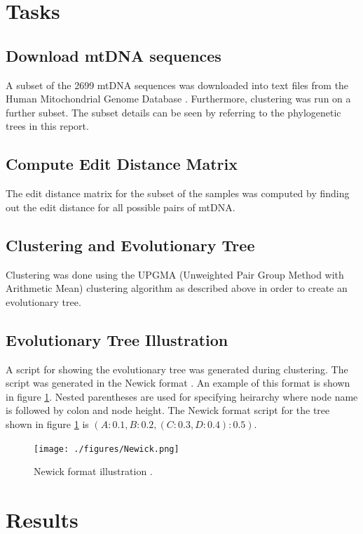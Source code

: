 \documentclass[conference]{IEEEtran}
\begin{document}
\section{Tasks}

\subsection{Download mtDNA sequences}
A subset of the 2699 mtDNA sequences was downloaded into text files from the Human Mitochondrial Genome Database \cite{mtDnaDatabase}. Furthermore, clustering was run on a further subset. The subset details can be seen by referring to the phylogenetic trees in this report.

\subsection{Compute Edit Distance Matrix}

The edit distance matrix for the subset of the samples was computed by finding out the edit distance for all possible pairs of mtDNA. 

\subsection{Clustering and Evolutionary Tree}
Clustering was done using the UPGMA (Unweighted Pair Group Method with Arithmetic Mean) clustering algorithm as described above in order to create an evolutionary tree.

\subsection{Evolutionary Tree Illustration}
A script for showing the evolutionary tree was generated during clustering. The script was generated in the Newick format \cite{Newick}. An example of this format is shown in figure \ref{NewickFormat}. Nested parentheses are used for specifying heirarchy where node name is followed by colon and node height. The Newick format script for the tree shown in figure \ref{NewickFormat} is $(A:0.1,B:0.2,(C:0.3,D:0.4):0.5)$.


\begin{figure}[!t]
\centering
\texttt{[image: ./figures/Newick.png]}
\caption{Newick format illustration \cite{Newick} .}
\label{NewickFormat}
\end{figure}

\FloatBarrier
\section{Results}
\end{document}
